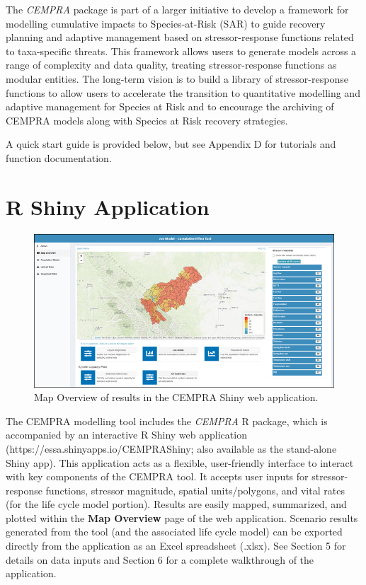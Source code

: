 \documentclass[
  letterpaper,
  DIV=11,
  numbers=noendperiod]{scrreprt}
\begin{document}
The \emph{CEMPRA} package is part of a larger initiative to develop a
framework for modelling cumulative impacts to Species-at-Risk (SAR) to
guide recovery planning and adaptive management based on
stressor-response functions related to taxa-specific threats. This
framework allows users to generate models across a range of complexity
and data quality, treating stressor-response functions as modular
entities. The long-term vision is to build a library of
stressor-response functions to allow users to accelerate the transition
to quantitative modelling and adaptive management for Species at Risk
and to encourage the archiving of CEMPRA models along with Species at
Risk recovery strategies.

A quick start guide is provided below, but see Appendix D for tutorials
and function documentation.

\hypertarget{r-shiny-application-1}{%
\section{R Shiny Application}\label{r-shiny-application-1}}

\begin{figure}

{\centering \includegraphics{images/image011.png}

}

\caption{Map Overview of results in the CEMPRA Shiny web application.}

\end{figure}

The CEMPRA modelling tool includes the \emph{CEMPRA} R package, which is
accompanied by an interactive R Shiny web application
(https://essa.shinyapps.io/CEMPRAShiny; also available as the
stand-alone Shiny app). This application acts as a flexible,
user-friendly interface to interact with key components of the CEMPRA
tool. It accepts user inputs for stressor-response functions, stressor
magnitude, spatial units/polygons, and vital rates (for the life cycle
model portion). Results are easily mapped, summarized, and plotted
within the \textbf{Map Overview} page of the web application. Scenario
results generated from the tool (and the associated life cycle model)
can be exported directly from the application as an Excel spreadsheet
(.xlsx). See Section 5 for details on data inputs and Section 6 for a
complete walkthrough of the application.
\end{document}
